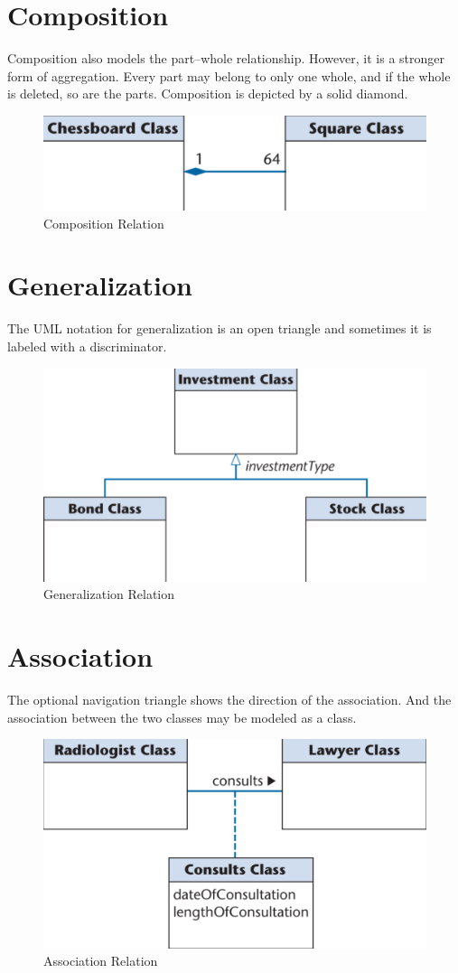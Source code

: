 \documentclass[11pt]{article}
\begin{document}
\section*{Composition}

Composition also models the part–whole relationship. However, it is a stronger form of aggregation. Every part may belong to only one whole, and if the whole is deleted, so are the parts. Composition is depicted by a solid diamond.

\begin{figure}[h]
	\centering
	\includegraphics[width=0.5\linewidth]{images/Composition.png}
	\caption{Composition Relation}
	\label{fig:Composition}
\end{figure}

\section*{Generalization}

The UML notation for generalization is an open triangle and sometimes it is labeled with a discriminator.

\begin{figure}[h]
	\centering
	\includegraphics[width=0.5\linewidth]{images/Generalization.png}
	\caption{Generalization Relation}
	\label{fig:Generalization}
\end{figure}

\section*{Association}

The optional navigation triangle shows the direction of the association. And the association between the two classes may be modeled as a class.


\begin{figure}[h]
	\centering
	\includegraphics[width=0.5\linewidth]{images/Association.png}
	\caption{Association Relation}
	\label{fig:Association}
\end{figure}
\end{document}
